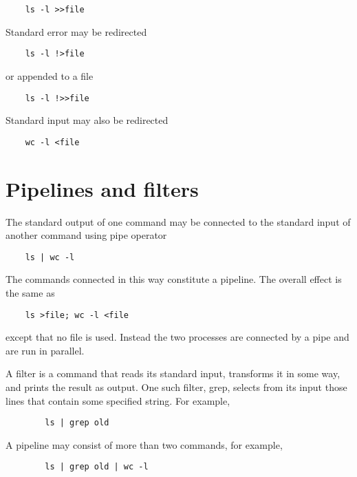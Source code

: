 \documentclass[12pt]{book}
\begin{document}
\begin{lstlisting}
	ls -l >>file
\end{lstlisting}

Standard error may be redirected

\begin{lstlisting}
	ls -l !>file
\end{lstlisting}

or appended to a file

\begin{lstlisting}
	ls -l !>>file
\end{lstlisting}

Standard input may also be redirected

\begin{lstlisting}
	wc -l <file
\end{lstlisting}


\section{Pipelines and filters}

The standard output of one command may be connected to the standard
input of another command using pipe operator

\begin{lstlisting}
	ls | wc -l
\end{lstlisting}

The commands connected in this way constitute a pipeline. The
overall effect is the same as

\begin{lstlisting}
	ls >file; wc -l <file
\end{lstlisting}

except that no file is used. Instead the two processes are connected
by a pipe and are run in parallel.

A filter is a command that reads its standard input, transforms it
in some way, and prints the result as output. One such filter, grep,
selects from its input those lines that contain some specified
string. For example, 

\begin{lstlisting}
    	ls | grep old
\end{lstlisting}

A pipeline may consist of more than two commands, for example,

\begin{lstlisting}
    	ls | grep old | wc -l
\end{lstlisting}
\end{document}
